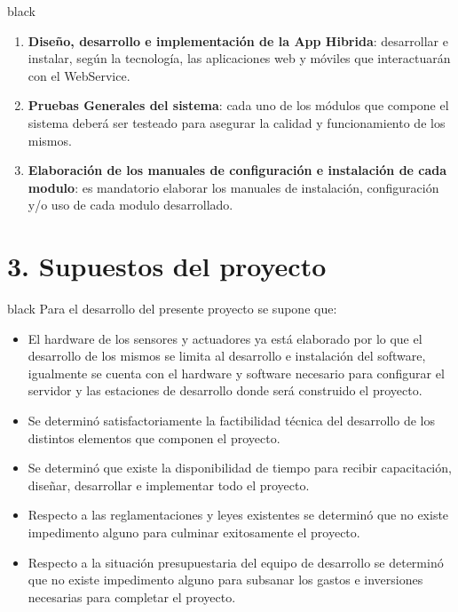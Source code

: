 \documentclass[11pt]{charter}
\begin{document}
\begin{consigna}{black}
\begin{enumerate}
	\item \textbf{Diseño, desarrollo e implementación de la App Hibrida}: desarrollar e instalar, según la tecnología, las aplicaciones web y móviles que interactuarán con el WebService.
	\item \textbf{Pruebas Generales del sistema}: cada uno de los módulos que compone el sistema deberá ser testeado para asegurar la calidad y funcionamiento de los mismos.
	\item \textbf{Elaboración de los manuales de configuración e instalación de cada modulo}: es mandatorio elaborar los manuales de instalación, configuración y/o uso de cada modulo desarrollado.
\end{enumerate}
\end{consigna}


\section{3. Supuestos del proyecto}
\label{sec:supuestos}

\begin{consigna}{black}
Para el desarrollo del presente proyecto se supone que: 

\begin{itemize}
	\item El hardware de los sensores y actuadores ya está elaborado por lo que el desarrollo de los mismos se limita al desarrollo e instalación del software, igualmente se cuenta con el hardware y software necesario para configurar el servidor y las estaciones de desarrollo donde será construido  el proyecto.
	\item Se determinó satisfactoriamente la factibilidad técnica del desarrollo de los distintos elementos que componen el proyecto.
	\item Se determinó que existe la disponibilidad de tiempo para recibir capacitación, diseñar, desarrollar e implementar todo el proyecto.
	\item Respecto a las reglamentaciones y leyes existentes se determinó que no existe impedimento alguno para culminar exitosamente el proyecto.
	\item Respecto a la situación presupuestaria del equipo de desarrollo se determinó que no existe impedimento alguno para subsanar los gastos e inversiones necesarias para completar el proyecto.
\end{itemize}
%
\end{consigna}
\end{document}
